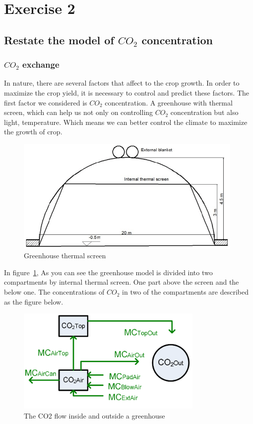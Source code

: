 \documentclass[a4paper]{article}
\numberwithin{equation}{section}
\begin{document}
\newpage
\section{Exercise 2}
	\subsection{Restate the model of \(CO_2\) concentration}
\subsubsection{\(CO_2\) exchange}
In nature, there are several factors that affect to the crop growth. In order to maximize the crop yield, it is necessary to control and predict these factors. The first factor we considered is \(CO_2\) concentration. A greenhouse with thermal screen, which can help us not only on controlling \(CO_2\) concentration but also light, temperature. Which means we can better control the climate to maximize the growth of crop.
\begin{figure}[H]
  \centering
  \includegraphics[width=11cm]{thrscr.png}
  \caption{Greenhouse thermal screen}\label{fig:thrscr}
\end{figure}

In figure~\ref{fig:thrscr}, As you can see the greenhouse model is divided into two compartments by internal thermal screen. One part above the screen and the below one. 
The concentrations of \(CO_2\) in two of the compartments are described as the figure below.
\begin{figure}[H]
  \centering
  \includegraphics[width=9cm]{CO2}
  \caption{The CO2 flow inside and outside a greenhouse}\label{fig:CO2}
\end{figure}
\end{document}

